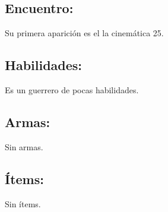 \subsection{Encuentro:}
Su primera aparición es el la cinemática 25.
\subsection{Habilidades:}
Es un guerrero de pocas habilidades. 
\subsection{Armas:}
Sin armas.
\subsection{Ítems:}
Sin ítems.